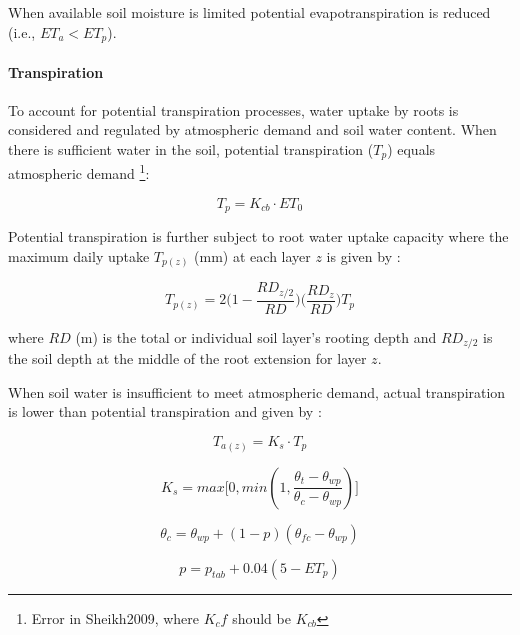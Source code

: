 \documentclass[]{article}
\let\oldparagraph\paragraph
\renewcommand{\paragraph}[1]{\oldparagraph{#1}\mbox{}}
\let\rmarkdownfootnote\footnote%
\def\footnote{\protect\rmarkdownfootnote}
\begin{document}
When available soil moisture is limited potential evapotranspiration is
reduced (i.e., \(ET_a < ET_p\)).

\paragraph{Transpiration}\label{transpiration}

To account for potential transpiration processes, water uptake by roots
is considered and regulated by atmospheric demand and soil water
content. When there is sufficient water in the soil, potential
transpiration (\(T_p\)) equals atmospheric demand
\citep{Sheikh2009}\footnote{Error in Sheikh2009, where $K_{c}f$ should be $K_{cb}$}:

\begin{equation}
T_p=K_{cb} \cdot ET_0
\label{eq:Tp}  
\end{equation}

Potential transpiration is further subject to root water uptake capacity
where the maximum daily uptake \(T_{p(z)}\) (mm) at each layer \(z\) is
given by \citep{Prasad1988}:

\begin{equation}
T_{p(z)} = 2 \Big( 1- \frac{RD_{z/2} }{RD} \Big) \Big( \frac{RD_z}{RD} \Big) T_p
\label{eq:Tpz}  
\end{equation}

where \(RD\) (m) is the total or individual soil layer's rooting depth
and \(RD_{z/2}\) is the soil depth at the middle of the root extension
for layer \(z\).

When soil water is insufficient to meet atmospheric demand, actual
transpiration is lower than potential transpiration and given by
\citep{Sheikh2009}:

\begin{equation}
T_{a(z)} = K_s \cdot T_p
\label{eq:Taz}  
\end{equation}

\begin{equation}
K_s= max \Big[ 0, min(1, \frac{\theta_t - \theta_{wp} }{ \theta_c - \theta_{wp} }) \Big]
\label{eq:Ks}  
\end{equation}

\begin{equation}
\theta_c = \theta_{wp} + (1 - p)(\theta_{fc}- \theta_{wp}) 
\label{eq:theta_c}  
\end{equation}

\begin{equation}
p = p_{tab} + 0.04(5-ET_p)
\label{eq:p}  
\end{equation}
\end{document}
